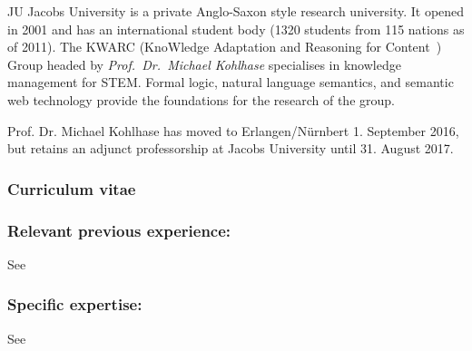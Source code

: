 \begin{sitedescription}{JU}
  Jacobs University is a private Anglo-Saxon style research university.  It opened in 2001
  and has an international student body (1320 students from 115 nations as of 2011).  The
  KWARC (KnoWledge Adaptation and Reasoning for Content~\cite{KWARC:online}) Group headed
  by {\emph{Prof.\ Dr.\ Michael Kohlhase}} specialises in knowledge management for STEM.
  Formal logic, natural language semantics, and semantic web technology provide the
  foundations for the research of the group.
  
  Prof. Dr. Michael Kohlhase has moved to  Erlangen/N\"urnbert 1. September
  2016, but retains an adjunct professorship at Jacobs University until 31. August 2017.  

\subsubsection*{Curriculum vitae}





\subsubsection*{Relevant previous experience:}
See 

\subsubsection*{Specific expertise:}
See 
\end{sitedescription}


